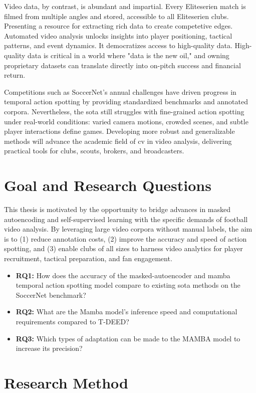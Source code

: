 Video data, by contrast, is abundant and impartial. Every Eliteserien match is filmed from multiple angles and stored, accessible to all Eliteserien clubs. Presenting a resource for extracting rich data to create competetive edges. Automated video analysis unlocks insights into player positioning, tactical patterns, and event dynamics. It democratizes access to high-quality data. High-quality data is critical in a world where "data is the new oil," and owning proprietary datasets can translate directly into on-pitch success and financial return.  

Competitions such as SoccerNet's annual challenges have driven progress in temporal action spotting by providing standardized benchmarks and annotated corpora. Nevertheless, the \acrlong{sota} still struggles with fine-grained action spotting under real-world conditions: varied camera motions, crowded scenes, and subtle player interactions define games. Developing more robust and generalizable methods will advance the academic field of \acrshort{cv} in video analysis, delivering practical tools for clubs, scouts, brokers, and broadcasters.  


\section{Goal and Research Questions}
This thesis is motivated by the opportunity to bridge advances in masked autoencoding and self-supervised learning with the specific demands of football video analysis. By leveraging large video corpora without manual labels, the aim is to (1) reduce annotation costs, (2) improve the accuracy and speed of action spotting, and (3) enable clubs of all sizes to harness video analytics for player recruitment, tactical preparation, and fan engagement.  
\label{sec:research_questions}
\begin{itemize}
    \item \textbf{RQ1:} How does the accuracy of the masked-autoencoder and mamba temporal action spotting model compare to existing \acrlong{sota} methods on the SoccerNet benchmark?
    \item \textbf{RQ2:} What are the Mamba model's inference speed and computational requirements compared to T-DEED?
    \item \textbf{RQ3:} Which types of adaptation can be made to the MAMBA model to increase its precision?
\end{itemize}

\section{Research Method}

